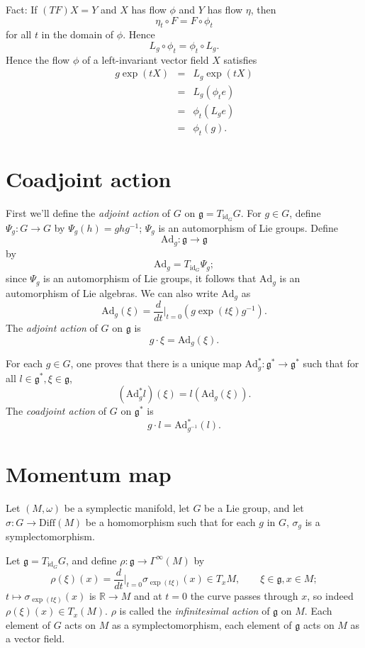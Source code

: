 \documentclass{article}
\newcommand{\Diff}{\textrm{Diff}}
\newcommand{\id}{\textrm{id}}
\newcommand{\Ad}{\textrm{Ad}}
\begin{document}
Fact: If $(TF)X=Y$ and $X$ has flow $\phi$ and $Y$ has flow $\eta$, then
\[
\eta_t \circ F = F \circ \phi_t
\]
for all $t$ in the domain of $\phi$. Hence
\[
L_g \circ \phi_t  =\phi_t \circ L_g.
\]
Hence
the flow $\phi$ of a left-invariant vector field $X$ satisfies
\begin{eqnarray*}
g\exp(tX)&=&L_g \exp(tX)\\
&=&L_g(\phi_t e)\\
&=&\phi_t (L_g e)\\
&=&\phi_t (g).
\end{eqnarray*}

\section{Coadjoint action}
\label{coadjoint}
First we'll define the {\em adjoint action} of $G$ on $\mathfrak{g}=T_{\id_G} G$. For $g \in G$, 
define $\Psi_g:G \to G$ by $\Psi_g(h)=ghg^{-1}$; $\Psi_g$ is an automorphism of Lie groups. Define
\[
\Ad_g:\mathfrak{g} \to \mathfrak{g}
\]
by
\[
\Ad_g=T_{\id_G} \Psi_g;
\]
since $\Psi_g$ is an automorphism of Lie groups, it follows that $\Ad_g$ is an automorphism of Lie algebras. We can also write $\Ad_g$ as
\[
\Ad_g(\xi)=\frac{d}{dt}\Big|_{t=0} (g\exp(t\xi)g^{-1}).
\]
The {\em adjoint action} of $G$ on $\mathfrak{g}$ is
\[
g\cdot \xi=\Ad_g(\xi).
\]

For each $g \in G$,
one proves that there is a unique map $\Ad_g^*:\mathfrak{g}^* \to \mathfrak{g}^*$ such that for all $l \in \mathfrak{g}^*,\xi \in \mathfrak{g}$,
\[
(\Ad_g^* l)(\xi)=l(\Ad_g(\xi)).
\]
The {\em coadjoint action} of $G$ on $\mathfrak{g}^*$ is 
\[
g\cdot l = \Ad_{g^{-1}}^*(l).
\]

\section{Momentum map}
Let $(M,\omega)$ be a symplectic manifold, let $G$ be a Lie group, and let $\sigma:G \to \Diff(M)$ be a homomorphism such that for each $g$ in $G$, $\sigma_g$ is a symplectomorphism.

Let $\mathfrak{g}=T_{\id_G}G$, and
define $\rho:\mathfrak{g} \to \Gamma^\infty(M)$ by
\[
\rho(\xi)(x)= \frac{d}{dt}\Big|_{t=0}  \sigma_{\exp(t\xi)} ( x)  \in T_xM, \qquad \xi \in \mathfrak{g}, x \in M;
\]
$t \mapsto \sigma_{\exp(t\xi)}(x)$ is $\mathbb{R} \to M$ and at $t=0$ the curve passes through $x$, so indeed $\rho(\xi)(x) \in T_x(M)$. 
$\rho$ is called the {\em infinitesimal action} of $\mathfrak{g}$ on $M$. Each element of $G$ acts on $M$ as a symplectomorphism, each element of
$\mathfrak{g}$ acts on $M$ as a vector field.
\end{document}
